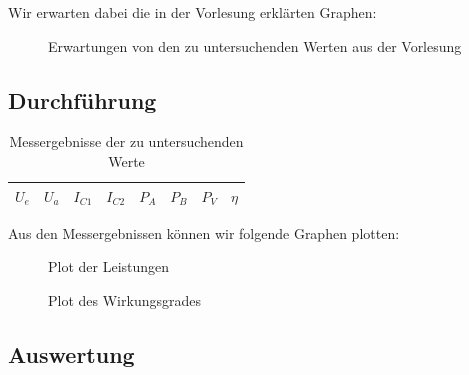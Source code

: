 \documentclass{article}
\begin{document}
Wir erwarten dabei die in der Vorlesung erklärten Graphen:

\begin{figure}[h]
  \centering

  \caption{Erwartungen von den zu untersuchenden Werten aus der Vorlesung}
  \label{fig:erwartung}
\end{figure}

\subsection{Durchführung}
\label{sec:durchfuhrung}

\begin{table}[h]
  \centering
  \begin{tabular}{|c|c|c|c|c|c|c|c|}
    $U_{e}$& $U_{a}$ & $I_{C1}$& $I_{C2}$&$P_{A}$&$P_{B}$&$P_{V}$& $\eta$\\
    \hline
  \end{tabular}
  \caption{Messergebnisse der zu untersuchenden Werte}
  \label{tab:messungauf3}
\end{table}

Aus den Messergebnissen können wir folgende Graphen plotten:


\begin{figure}[h]
  \centering

  \caption{Plot der Leistungen}
  \label{fig:powerplot}
\end{figure}


\begin{figure}[h]
  \centering

  \caption{Plot des Wirkungsgrades}
  \label{fig:eff}
\end{figure}

\subsection{Auswertung}
\label{sec:auswertung-2}




{}
\end{document}
